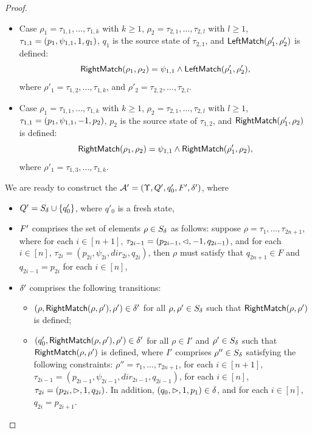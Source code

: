 \begin{proof}
\begin{itemize}
\item Case $\rho_1 =  \tau_{1,1}, \ldots, \tau_{1,k}$ with $k \ge 1$, $\rho_2 = \tau_{2,1}, \ldots, \tau_{2,l}$ with $l \ge 1$, $\tau_{1,1} = (p_1, \psi_{1,1}, 1, q_1)$, $q_1$ is the source state of $\tau_{2,1}$, and $\mathsf{LeftMatch}(\rho'_{1}, \rho'_2)$ is defined:  
$$\mathsf{RightMatch}(\rho_1, \rho_2) =\psi_{1,1} \wedge \mathsf{LeftMatch}(\rho'_{1}, \rho'_2),$$ 
where $\rho'_1 = \tau_{1, 2},\ldots, \tau_{1,k}$, and $\rho'_2 = \tau_{2,2}, \ldots, \tau_{2,l}$.
%
\item Case $\rho_1 =  \tau_{1,1}, \ldots, \tau_{1,k}$ with $k \ge 1$, $\rho_2 = \tau_{2,1}, \ldots, \tau_{2,l}$ with $l \ge 1$, $\tau_{1,1} = (p_1, \psi_{1,1}, -1, p_2)$, $p_2$ is the source state of $\tau_{1,2}$, and $\mathsf{RightMatch}(\rho'_1, \rho_2)$ is defined:  
$$\mathsf{RightMatch}(\rho_1, \rho_2) = \psi_{1,1} \wedge \mathsf{RightMatch}(\rho'_1, \rho_2),$$ 
where $\rho'_1 = \tau_{1,3}, \ldots, \tau_{1,k}$.
%
\end{itemize}
%
We are ready to construct the \SA{} $\mathcal{A}' =  (\Upsilon, Q', q'_0, F', \delta')$, where
\begin{itemize}
\item $Q' = S_{\delta} \cup \{q'_0\}$, where $q'_0$ is a fresh state,
%
\item $F'$ comprises the set of elements $\rho \in S_{\delta}$ as follows: suppose $\rho = \tau_1, \ldots, \tau_{2n+1}$, where for each $i \in [n+1]$, $\tau_{2i-1} = (p_{2i-1}, \vartriangleleft, -1, q_{2i-1})$, and for each $i \in [n]$, $\tau_{2i} = (p_{2i}, \psi_{2i}, dir_{2i}, q_{2i})$, then $\rho$ must satisfy that $q_{2n+1} \in F$ and $q_{2i-1} = p_{2i}$ for each $i \in [n]$,  
%
\item $\delta'$ comprises the following transitions: 
%
\begin{itemize}
%
\item $(\rho, \mathsf{RightMatch}(\rho, \rho'), \rho') \in \delta'$ for all $\rho, \rho' \in S_{\delta}$ such that $\mathsf{RightMatch}(\rho, \rho')$ is defined;
%
\item  
%
$(q'_0, \mathsf{RightMatch}(\rho, \rho'), \rho') \in \delta'$ for all $\rho \in I'$ and $\rho' \in S_{\delta}$ such that $\mathsf{RightMatch}(\rho, \rho')$ is defined, where 
$I'$ comprises $\rho'' \in S_{\delta}$ satisfying the following constraints: $\rho'' = \tau_1, \ldots, \tau_{2n+1}$,  for each $i \in [n+1]$, $\tau_{2i-1} = (p_{2i-1}, \psi_{2i-1}, dir_{2i-1}, q_{2i-1})$, for each $i \in [n]$, $\tau_{2i} = (p_{2i}, \vartriangleright, 1, q_{2i})$. In addition, $(q_0, \vartriangleright, 1, p_1) \in \delta$, and for each $i \in [n]$, $q_{2i} = p_{2i+1}$. 
\end{itemize}
%
\end{itemize}


\end{proof}
